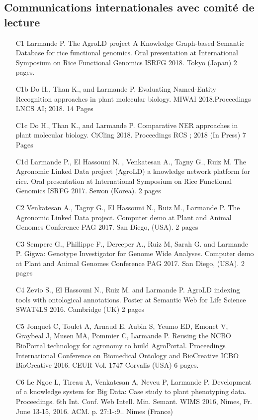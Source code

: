 \subsection*{Communications internationales avec comité de lecture}
\begin{itemize} 
\item [C1] Larmande P. The AgroLD project A Knowledge Graph-based Semantic Database for rice functional genomics. Oral presentation at International Symposium on Rice Functional Genomics ISRFG 2018. Tokyo (Japan) 2 pages.
\item [C1b] Do H., Than K., and Larmande P. Evaluating Named-Entity Recognition approaches in plant molecular biology. MIWAI 2018.Proceedings LNCS AI; 2018. 14 Pages
\item [C1c] Do H., Than K., and Larmande P. Comparative NER approaches in plant molecular biology. CiCling 2018. Proceedings RCS ; 2018 (In Press) 7 Pages
\item [C1d]	Larmande P., El Hassouni N. , Venkatesan A., Tagny G., Ruiz M. The Agronomic Linked Data project (AgroLD) a knowledge network platform for rice. Oral presentation at International Symposium on Rice Functional Genomics ISRFG 2017. Sewon (Korea). 2 pages
\item [C2]	Venkatesan A., Tagny G., El Hassouni N., Ruiz M., Larmande P. The Agronomic Linked Data project. Computer demo at Plant and Animal Genomes Conference PAG 2017. San Diego, (USA). 2 pages
\item [C3]	 Sempere G., Phillippe  F., Dereeper A., Ruiz M, Sarah G. and Larmande P. Gigwa: Genotype Investigator for Genome Wide Analyses. Computer demo at Plant and Animal Genomes Conference PAG 2017. San Diego, (USA). 2 pages
\item [C4]	Zevio S., El Hassouni N., Ruiz M. and Larmande P. AgroLD indexing tools with ontological annotations. Poster at Semantic Web for Life Science SWAT4LS 2016. Cambridge (UK) 2 pages
\item [C5]	Jonquet C, Toulet A, Arnaud E, Aubin S, Yeumo ED, Emonet V, Graybeal J, Musen MA, Pommier C, Larmande P.   Reusing the NCBO BioPortal technology for agronomy to build AgroPortal. Proceedings International Conference on Biomedical Ontology and BioCreative ICBO BioCreative 2016. CEUR Vol. 1747 Corvalis (USA) 6 pages.
\item [C6]	Le Ngoc L, Tireau A, Venkatesan A, Neveu P, Larmande P. Development of a knowledge system for Big Data: Case study to plant phenotyping data. Proceedings. 6th Int. Conf. Web Intell. Min. Semant. WIMS 2016, Nimes, Fr. June 13-15, 2016. ACM. p. 27:1-:9.. Nimes (France) 

\end{itemize}

